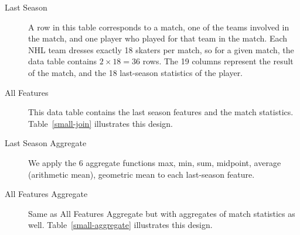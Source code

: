 \documentclass[conference]{IEEEtran}
\begin{document}
\begin{description}
\item[Last Season] A row in this table corresponds to a match, one of the teams involved in the match, and one player who played for that team in the match. Each NHL team dresses exactly 18 skaters per match, so for a given match, the data table contains $2 \times 18 = 36$ rows. The 19 columns represent the result of the match, and the 18 last-season statistics of the player.
\item[All Features] This data table contains the last season features and the match statistics.
Table~\ref{small-join} illustrates this design.
\item[Last Season Aggregate] We apply the 6 aggregate functions max, min, sum, midpoint, average (arithmetic mean), geometric mean to each last-season feature.
\item[All Features Aggregate] Same as All Features Aggregate but with aggregates of match statistics as well.
Table~\ref{small-aggregate} illustrates this design.
\end{description}
\end{document}
